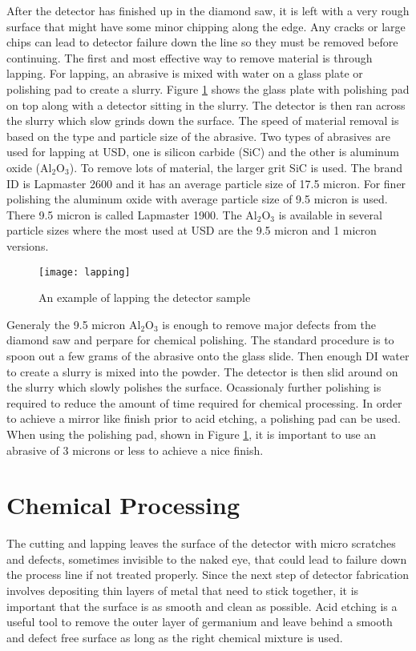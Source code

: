 After the detector has finished up in the diamond saw, it is left with a very rough surface that might have some minor chipping along the edge.
Any cracks or large chips can lead to detector failure down the line so they must be removed before continuing.
The first and most effective way to remove material is through lapping.
For lapping, an abrasive is mixed with water on a glass plate or polishing pad to create a slurry.
Figure \ref{fig:lapping} shows the glass plate with polishing pad on top along with a detector sitting in the slurry.
The detector is then ran across the slurry which slow grinds down the surface.
The speed of material removal is based on the type and particle size of the abrasive.
Two types of abrasives are used for lapping at USD, one is silicon carbide (SiC) and the other is aluminum oxide (Al$_2$O$_3$).
To remove lots of material, the larger grit SiC is used.
The brand ID is Lapmaster 2600 and it has an average particle size of 17.5 micron.
For finer polishing the aluminum oxide with average particle size of 9.5 micron is used.
There 9.5 micron is called Lapmaster 1900.
The Al$_2$O$_3$ is available in several particle sizes where the most used at USD are the 9.5 micron and 1 micron versions.
\begin{figure}[htpb]
\centering
\texttt{[image: lapping]}
\caption{An example of lapping the detector sample}
\label{fig:lapping}
\end{figure}
Generaly the 9.5 micron Al$_2$O$_3$ is enough to remove major defects from the diamond saw and perpare for chemical polishing.
The standard procedure is to spoon out a few grams of the abrasive onto the glass slide.
Then enough DI water to create a slurry is mixed into the powder.
The detector is then slid around on the slurry which slowly polishes the surface.
Ocassionaly further polishing is required to reduce the amount of time required for chemical processing.
In order to achieve a mirror like finish prior to acid etching, a polishing pad can be used.
When using the polishing pad, shown in Figure \ref{fig:lapping}, it is important to use an abrasive of 3 microns or less to achieve a nice finish.
\section{Chemical Processing}

The cutting and lapping leaves the surface of the detector with micro scratches and defects, sometimes invisible to the naked eye, that could lead to failure down the process line if not treated properly.
Since the next step of detector fabrication involves depositing thin layers of metal that need to stick together, it is important that the surface is as smooth and clean as possible.
Acid etching is a useful tool to remove the outer layer of germanium and leave behind a smooth and defect free surface as long as the right chemical mixture is used.  

